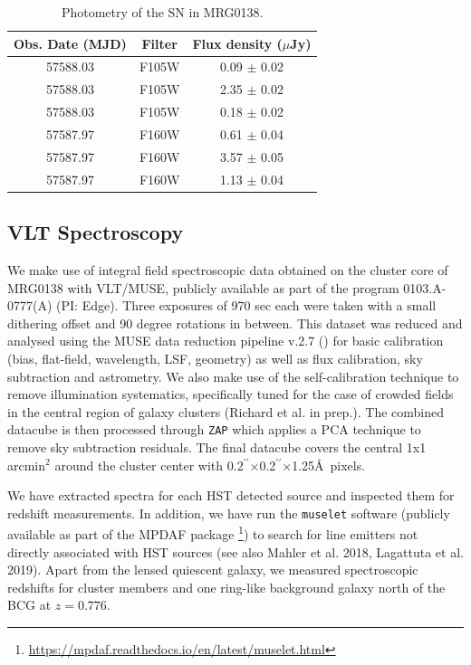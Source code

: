 \documentclass[12pt,dvipsnames]{article}
\gdef\arcsec{$^{\prime\prime}$}
\begin{document}
\begin{table}[h]
\centering
\begin{tabular}{ccc}
Obs. Date (MJD) & Filter & Flux density ($\mu$Jy) \\
\midrule
57588.03 & F105W & 0.09  $\pm$ 0.02 \\
57588.03 & F105W & 2.35  $\pm$ 0.02 \\
57588.03 & F105W & 0.18  $\pm$ 0.02 \\
57587.97 & F160W & 0.61  $\pm$ 0.04 \\
57587.97 & F160W & 3.57  $\pm$ 0.05 \\
57587.97 & F160W & 1.13  $\pm$ 0.04 \\
\end{tabular}
\caption{Photometry of the SN in MRG0138.
\label{tab:photometry}}
\end{table}

\subsection{VLT Spectroscopy}
\label{sec:vltmuse}

We make use of integral field spectroscopic data obtained on the cluster core of MRG0138 with VLT/MUSE, publicly 
available as part of the program 0103.A-0777(A) (PI: Edge). Three exposures of 970 sec each were taken with a small dithering offset and 90 degree rotations in between. This dataset was reduced and analysed using the MUSE data reduction pipeline v.2.7 (\cite{}) for basic calibration (bias, flat-field, wavelength, LSF, geometry) as well as flux calibration, sky subtraction and astrometry. We  also make use of the self-calibration technique \cite{bacon_muse_2017}  to remove illumination systematics, specifically tuned for the case of crowded fields in the central region of galaxy clusters (Richard et al. in prep.). The combined datacube is then processed through {\tt ZAP} \cite{soto_zap_2016} which applies a PCA technique to remove sky subtraction residuals. The final datacube covers the central 1x1 arcmin$^2$ around the cluster center with 0.2\arcsec$\times$0.2\arcsec$\times$1.25\AA\ pixels.

We have extracted spectra for each HST detected source and inspected them for redshift measurements. In addition, we have run the {\tt muselet} software (publicly available as part of the MPDAF package \cite{piqueras_mpdaf_2019}\footnote{\url{https://mpdaf.readthedocs.io/en/latest/muselet.html}}) to search for line emitters not directly associated with HST sources (see also Mahler et al. 2018, Lagattuta et al. 2019). Apart from the lensed quiescent galaxy, we measured spectroscopic redshifts for cluster members and one ring-like background galaxy north of the BCG at $z=0.776$.
\end{document}

